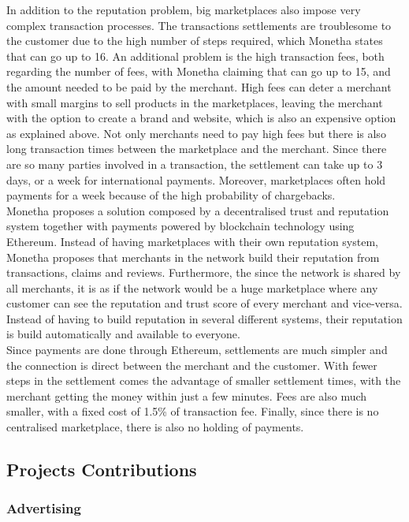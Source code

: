 In addition to the reputation problem, big marketplaces also impose very complex transaction processes. The transactions settlements are troublesome to the customer due to the high number of steps required, which Monetha states that can go up to 16. An additional problem is the high transaction fees, both regarding the number of fees, with Monetha claiming that can go up to 15, and the amount needed to be paid by the merchant. High fees can deter a merchant with small margins to sell products in the marketplaces, leaving the merchant with the option to create a brand and website, which is also an expensive option as explained above. Not only merchants need to pay high fees but there is also long transaction times between the marketplace and the merchant. Since there are so many parties involved in a transaction, the settlement can take up to 3 days, or a week for international payments. Moreover, marketplaces often hold payments for a week because of the high probability of chargebacks. \\

Monetha proposes a solution composed by a decentralised trust and reputation system together with payments powered by blockchain technology using Ethereum. Instead of having marketplaces with their own reputation system, Monetha proposes that merchants in the network build their reputation from transactions, claims and reviews. Furthermore, the since the network is shared by all merchants, it is as if the network would be a huge marketplace where any customer can see the reputation and trust score of every merchant and vice-versa. Instead of having to build reputation in several different systems, their reputation is build automatically and available to everyone. \\

Since payments are done through Ethereum, settlements are much simpler and the connection is direct between the merchant and the customer. With fewer steps in the settlement comes the advantage of smaller settlement times, with the merchant getting the money within just a few minutes. Fees are also much smaller, with a fixed cost of 1.5\% of transaction fee. Finally, since there is no centralised marketplace, there is also no holding of payments.

\subsection{Projects Contributions}
\subsubsection{Advertising}

